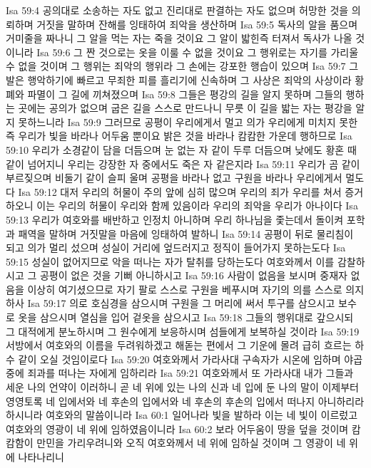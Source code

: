 Isa 59:4  공의대로 소송하는 자도 없고 진리대로 판결하는 자도 없으며 허망한 것을 의뢰하며 거짓을 말하며 잔해를 잉태하여 죄악을 생산하며
Isa 59:5  독사의 알을 품으며 거미줄을 짜나니 그 알을 먹는 자는 죽을 것이요 그 알이 밟힌즉 터져서 독사가 나올 것이니라
Isa 59:6  그 짠 것으로는 옷을 이룰 수 없을 것이요 그 행위로는 자기를 가리울 수 없을 것이며 그 행위는 죄악의 행위라 그 손에는 강포한 행습이 있으며
Isa 59:7  그 발은 행악하기에 빠르고 무죄한 피를 흘리기에 신속하며 그 사상은 죄악의 사상이라 황폐와 파멸이 그 길에 끼쳐졌으며
Isa 59:8  그들은 평강의 길을 알지 못하며 그들의 행하는 곳에는 공의가 없으며 굽은 길을 스스로 만드나니 무릇 이 길을 밟는 자는 평강을 알지 못하느니라
Isa 59:9  그러므로 공평이 우리에게서 멀고 의가 우리에게 미치지 못한즉 우리가 빛을 바라나 어두움 뿐이요 밝은 것을 바라나 캄캄한 가운데 행하므로
Isa 59:10  우리가 소경같이 담을 더듬으며 눈 없는 자 같이 두루 더듬으며 낮에도 황혼 때 같이 넘어지니 우리는 강장한 자 중에서도 죽은 자 같은지라
Isa 59:11  우리가 곰 같이 부르짖으며 비둘기 같이 슬피 울며 공평을 바라나 없고 구원을 바라나 우리에게서 멀도다
Isa 59:12  대저 우리의 허물이 주의 앞에 심히 많으며 우리의 죄가 우리를 쳐서 증거하오니 이는 우리의 허물이 우리와 함께 있음이라 우리의 죄악을 우리가 아나이다
Isa 59:13  우리가 여호와를 배반하고 인정치 아니하며 우리 하나님을 좇는데서 돌이켜 포학과 패역을 말하며 거짓말을 마음에 잉태하여 발하니
Isa 59:14  공평이 뒤로 물리침이 되고 의가 멀리 섰으며 성실이 거리에 엎드러지고 정직이 들어가지 못하는도다
Isa 59:15  성실이 없어지므로 악을 떠나는 자가 탈취를 당하는도다 여호와께서 이를 감찰하시고 그 공평이 없은 것을 기뻐 아니하시고
Isa 59:16  사람이 없음을 보시며 중재자 없음을 이상히 여기셨으므로 자기 팔로 스스로 구원을 베푸시며 자기의 의를 스스로 의지하사
Isa 59:17  의로 호심경을 삼으시며 구원을 그 머리에 써서 투구를 삼으시고 보수로 옷을 삼으시며 열심을 입어 겉옷을 삼으시고
Isa 59:18  그들의 행위대로 갚으시되 그 대적에게 분노하시며 그 원수에게 보응하시며 섬들에게 보복하실 것이라
Isa 59:19  서방에서 여호와의 이름을 두려워하겠고 해돋는 편에서 그 기운에 몰려 급히 흐르는 하수 같이 오실 것임이로다
Isa 59:20  여호와께서 가라사대 구속자가 시온에 임하며 야곱 중에 죄과를 떠나는 자에게 임하리라
Isa 59:21  여호와께서 또 가라사대 내가 그들과 세운 나의 언약이 이러하니 곧 네 위에 있는 나의 신과 네 입에 둔 나의 말이 이제부터 영영토록 네 입에서와 네 후손의 입에서와 네 후손의 후손의 입에서 떠나지 아니하리라 하시니라 여호와의 말씀이니라
Isa 60:1  일어나라 빛을 발하라 이는 네 빛이 이르렀고 여호와의 영광이 네 위에 임하였음이니라
Isa 60:2  보라 어두움이 땅을 덮을 것이며 캄캄함이 만민을 가리우려니와 오직 여호와께서 네 위에 임하실 것이며 그 영광이 네 위에 나타나리니
